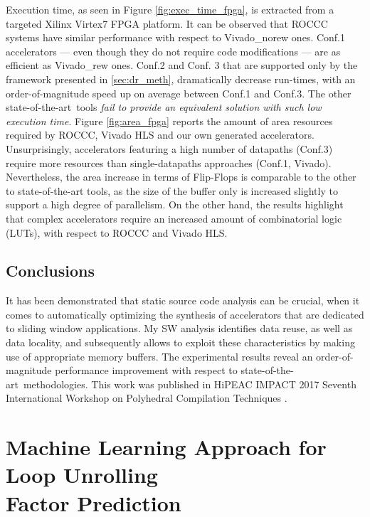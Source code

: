 \documentclass[]{usiinfthesis}
\newcommand{\SoTA}{{state-of-the-art}}
\begin{document}
Execution time, as seen in Figure \ref{fig:exec_time_fpga}, is extracted from 
a targeted Xilinx Virtex7 FPGA platform. 
It can be observed that ROCCC systems have similar
performance with respect to Vivado\_norew ones. Conf.1 accelerators 
--- even though they do not require code modifications --- are as 
efficient as Vivado\_rew ones. Conf.2 and Conf. 3 that are
supported only by the framework presented in \ref{sec:dr_meth}, dramatically decrease
run-times, with an order-of-magnitude speed up on average between
Conf.1 and Conf.3. The other \SoTA\ tools \emph{fail to 
provide an equivalent solution with such low execution time}.
Figure \ref{fig:area_fpga} reports the amount of area resources required by
ROCCC, Vivado HLS and our own generated accelerators.
Unsurprisingly, accelerators featuring a high number of datapaths (Conf.3) 
require more resources than single-datapaths approaches (Conf.1, Vivado). 
Nevertheless, the area increase in terms of Flip-Flops is comparable to 
the other to state-of-the-art tools, as the size of the buffer only is 
increased slightly to support a high degree of parallelism.
On the other hand, the results highlight that complex accelerators require 
an increased amount of combinatorial logic (LUTs), with respect to ROCCC 
and Vivado HLS.

\vspace{-0.3cm}
\subsection{Conclusions}

It has been demonstrated that static source code analysis can be crucial, when it comes to 
automatically optimizing the synthesis of accelerators that are dedicated to 
sliding window applications. My SW analysis identifies data reuse, as well as data locality,
and subsequently allows to exploit these characteristics by making use of appropriate
memory buffers. The experimental results reveal an order-of-magnitude performance 
improvement with respect to \SoTA\ methodologies. This work was published in 
HiPEAC IMPACT 2017 Seventh International Workshop on Polyhedral Compilation Techniques 
\cite{ZacharopoulosJan17}. 



%
%
%

\section[Machine Learning Approach for Loop Unrolling\\ Factor Prediction]
{Machine Learning Approach for Loop Unrolling\\ Factor Prediction}
\end{document}
